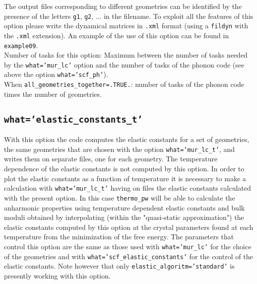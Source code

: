 \documentclass[12pt,a4paper]{article}
\begin{document}
The output files corresponding to different geometries can be identified
by the presence of the letters \texttt{g1}, \texttt{g2}, ... in the filename.
To exploit all the features of this option please write the dynamical matrices
in \texttt{.xml} format (using a \texttt{fildyn} with the \texttt{.xml}
extension).
An example of the use of this option can be found in \texttt{example09}. \\
Number of tasks for this option: Maximum between the number of tasks  
needed by the \texttt{what='mur\_lc'} option and the number
of tasks of the phonon code (see above the option \texttt{what='scf\_ph'}). \\
When \texttt{all\_geometries\_together=.TRUE.}: number of tasks of the
phonon code times the number of geometries. \\

\subsection{\color{web-blue}\texttt{what='elastic\_constants\_t'}}

With this option the code computes the elastic constants for a set of
geometries, the same geometries that are chosen with the option 
\texttt{what='mur\_lc\_t'}, and writes them on separate files, one for
each geometry. The temperature dependence of the elastic constants is
not computed by this option. In order to plot the elastic constants
as a function of temperature it is necessary to make a calculation
with \texttt{what='mur\_lc\_t'} having on files the elastic constants
calculated with the present option. In this case \texttt{thermo\_pw}
will be able to calculate the anharmonic properties using temperature
dependent elastic constants and bulk moduli obtained by interpolating 
(within the "quasi-static approximation") the elastic constants computed 
by this option at the crystal parameters 
found at each temperature from the minimization of the free energy. 
The parameters that control this option are the same as those used with  
\texttt{what='mur\_lc'} for the choice of the geometries and with
\texttt{what='scf\_elastic\_constants'} for the control of the elastic
constants. Note however that only \texttt{elastic\_algoritm='standard'}
is presently working with this option.
\end{document}
